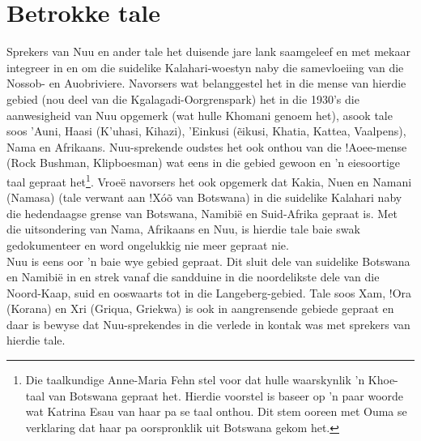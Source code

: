 \newpage


\markboth{}{}
\section{Betrokke tale}
\markboth{}{}

Sprekers van N\textipa{\textvertline}uu en ander tale het duisende
jare lank saamgeleef en met mekaar integreer in en om die suidelike
Kalahari-woestyn naby die samevloeiing van die Nossob- en Auobriviere.
Navorsers wat belanggestel het in die mense van hierdie gebied (nou
deel van die Kgalagadi-Oorgrenspark) het in die 1930's die
aanwesigheid van N\textipa{\textvertline}uu opgemerk (wat hulle
\textipa{\textdoublebarpipe}Khomani genoem het), asook tale soos
\textipa{\textvertline}'Auni, \textipa{\textvertline}Haasi
(K'u\textipa{\textvertline}ha\textipa{:}si,
Ki\textipa{\textvertline}hazi), \textipa{\textdoublebarpipe}'Einkusi
(\textipa{\textdoublebarpipe}\~{e}ikusi, Khatia, Kattea, Vaalpens),
Nama en Afrikaans. N\textipa{\textvertline}uu-sprekende oudstes het
ook onthou van die !Ao\textipa{\textdoublebarpipe}ee-mense (Rock
Bushman, Klipboesman) wat eens in die gebied gewoon en 'n eiesoortige
taal gepraat het\footnote{Die taalkundige Anne-Maria Fehn stel voor
dat hulle waarskynlik 'n Khoe-taal van Botswana gepraat het. Hierdie
voorstel is baseer op 'n paar woorde wat Katrina Esau van haar pa se
taal onthou.  Dit stem ooreen met Ouma se verklaring dat haar pa
oorspronklik uit Botswana gekom het.}. Vroe\"{e} navorsers het ook
opgemerk dat Kakia,
N\textipa{\textvertline}u\textipa{\textdoublevertline}en en
N\textipa{\textvertline}amani (N\textipa{\textvertline}amasa) (tale
verwant aan !X\'{o}\~{o} van Botswana) in die suidelike Kalahari naby
die hedendaagse grense van Botswana, Namibi\"{e} en Suid-Afrika
gepraat is. Met die uitsondering van Nama, Afrikaans en
N\textipa{\textvertline}uu, is hierdie tale baie swak gedokumenteer en
word ongelukkig nie meer gepraat nie.\\

N\textipa{\textvertline}uu is eens oor 'n baie wye gebied gepraat. Dit
sluit dele van suidelike Botswana en Namibi\"{e} in en strek vanaf die
sandduine in die noordelikste dele van die Noord-Kaap, suid en
ooswaarts tot in die Langeberg-gebied. Tale soos
\textipa{\textvertline}Xam, !Ora (Korana) en Xri (Griqua, Griekwa) is
ook in aangrensende gebiede gepraat en daar is bewyse dat
N\textipa{\textvertline}uu-sprekendes in die verlede in kontak was met
sprekers van hierdie tale.\\

